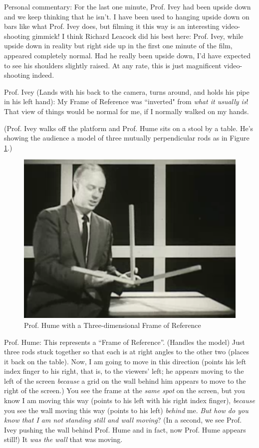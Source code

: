 \documentclass[a6paper]{article}
\newcommand{\perscom}[1]{
    {\footnotesize Personal commentary:  #1}
}
\begin{document}
\perscom{ For the last one minute, Prof. Ivey had been upside down and we keep thinking that he isn't. I have been used to hanging upside down on bars like what Prof. Ivey does, but filming it this way is an interesting video-shooting gimmick! I think Richard Leacock did his best here: Prof. Ivey, while upside down in reality but right side up in the first one minute of the film, appeared completely normal. Had he really been upside down, I'd have expected to see his shoulders slightly raised. At any rate, this is just magnificent video-shooting indeed.}

Prof. Ivey (Lands with his back to the camera, turns around, and holds his pipe in his left hand): My Frame of Reference was ``inverted" from \emph{what it usually is}! That view of things would be normal for me, if I normally walked on my hands.

(Prof. Ivey walks off the platform and Prof. Hume sits on a stool by a table. He's showing the audience a model of three mutually perpendicular rods as in Figure \ref{fig: a-3d-for}.)
        \begin{figure}[h!]
            \centering
            \includegraphics[width=0.5\linewidth]{prof-hume-with-an-example-frame-of-reference.png}
            \caption{Prof. Hume with a Three-dimensional Frame of Reference}
            \label{fig: a-3d-for}
        \end{figure}

Prof. Hume: This represents a ``Frame of Reference''. (Handles the model) Just three rods stuck together so that each is at right angles to the other two (places it back on the table). Now, I am going to move in this direction (points his left index finger to his right, that is, to the viewers' left; he appears moving to the left of the screen \emph{because} a grid on the wall behind him appears to move to the right of the screen.) You see the frame at the \emph{same spot} on the screen, but you know I am moving this way (points to his left with his right index finger), \emph{because} you see the wall moving this way (points to his left) \emph{behind} me. \emph{But how do you know that I am not standing still and wall moving}? (In a second, we see Prof. Ivey pushing the wall behind Prof. Hume and in fact, now Prof. Hume appears still!) It \emph{was the wall} that was moving.
\end{document}
